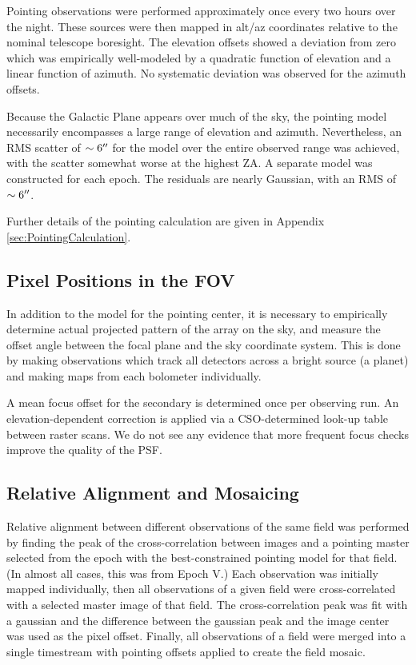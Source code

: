 \documentclass[12pt,preprint]{aastex}
\begin{document}
Pointing observations were performed approximately once every two
hours over the night.  These sources were then mapped in alt/az
coordinates relative to the nominal telescope boresight.  The
elevation offsets showed a deviation from zero which was empirically
well-modeled by a quadratic function of elevation and a linear
function of azimuth.  No systematic deviation was observed for the
azimuth offsets.  

Because the Galactic Plane appears over much of the sky, the pointing
model necessarily encompasses a large range of elevation and azimuth.
Nevertheless, an RMS scatter of $\sim 6\mbox{$^{\prime\prime}$}$ for the model over the
entire observed range was achieved, with the scatter somewhat worse at
the highest ZA.  A separate model was constructed for each epoch.  The
residuals are nearly Gaussian, with an RMS of $\sim6\mbox{$^{\prime\prime}$}$.  

Further details of the pointing calculation are given in Appendix
\ref{sec:PointingCalculation}.

\subsection{Pixel Positions in the FOV}

In addition to the model for the pointing center, it is necessary to
empirically determine actual projected pattern of the array on the
sky, and measure the offset angle between the focal plane and the sky
coordinate system.  This is done by making observations which track
all detectors across a bright source (a planet) and making maps from each
bolometer individually.

A mean focus offset for the secondary is determined once per observing
run.  An elevation-dependent correction is applied via a
CSO-determined look-up table between raster scans.  We do not see any
evidence that more frequent focus checks improve the quality of the
PSF.

\subsection{Relative Alignment and Mosaicing}

Relative alignment between different observations of the same field
was performed by finding the peak of the cross-correlation between
images and a pointing master selected from the epoch with the
best-constrained pointing model for that field. (In almost all cases,
this was from Epoch V.)  Each observation was initially mapped
individually, then all observations of a given field were
cross-correlated with a selected master image of that field. The
cross-correlation peak was fit with a gaussian and the difference
between the gaussian peak and the image center was used as the pixel
offset. 
Finally, all observations of a field were merged into a single
timestream with pointing offsets applied to create the field mosaic.
\end{document}
